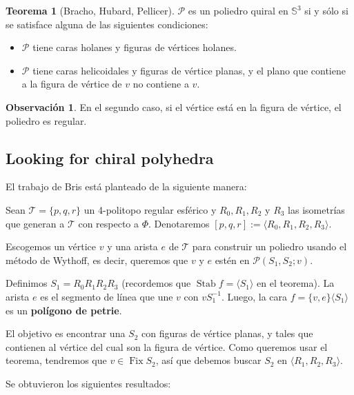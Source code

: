 \documentclass[spanish]{article}
\theoremstyle{definition}
\newtheorem*{obs}{Observación}
\newtheorem*{teo}{Teorema}
\newcommand{\s}{\mathbb{S}}
\newcommand{\p}{\mathcal{P}}
\newcommand{\T}{\mathcal{T}}
\DeclareMathOperator{\Fix}{Fix}
\DeclareMathOperator{\Stab}{Stab}
\begin{document}
	\begin{teo}[Bracho, Hubard, Pellicer]
		$\p$ es un poliedro quiral en $\s^3$ si y sólo si se satisface alguna de las siguientes condiciones:
		\begin{itemize}
			\item $\p$ tiene caras holanes y figuras de vértices holanes.
			\item $\p$ tiene caras helicoidales y figuras de vértice planas, y el plano que contiene a la figura de vértice de $v$ no contiene a $v$.
		\end{itemize}
	\end{teo}
	\begin{obs}
		En el segundo caso, si el vértice está en la figura de vértice, el poliedro es regular.
	\end{obs}
	
	\subsection{Looking for chiral polyhedra}
	El trabajo de Bris está planteado de la siguiente manera:
	
	Sean $\T=\{p,q,r\}$ un 4-politopo regular esférico y $R_0,R_1,R_2$ y $R_3$ las isometrías que generan a $\T$ con respecto a $\Phi$. Denotaremos $[p,q,r]:=\langle R_0,R_1,R_2,R_3\rangle$.
	
	Escogemos un vértice $v$ y una arista $e$ de $\T$ para construir un poliedro usando el método de Wythoff, es decir, queremos que $v$ y $e$ estén en $\p(S_1,S_2;v)$.
	
	Definimos $S_1=R_0R_1R_2R_3$ (recordemos que $\Stab f=\langle S_1\rangle$ en el teorema).  La arista $e$ es el segmento de línea que une $v$ con $vS_1^{-1}$. Luego, la cara $f=\{v,e\}\langle S_1\rangle$ es un \textbf{polígono de petrie}.
	
	El objetivo es encontrar una $S_2$ con figuras de vértice planas, y tales que contienen al vértice del cual son la figura de vértice. Como queremos usar el teorema, tendremos que $v\in\Fix S_2$, así que debemos buscar $S_2$ en $\langle R_1,R_2,R_3\rangle$.
	
	Se obtuvieron los siguientes resultados:
	
\end{document}
